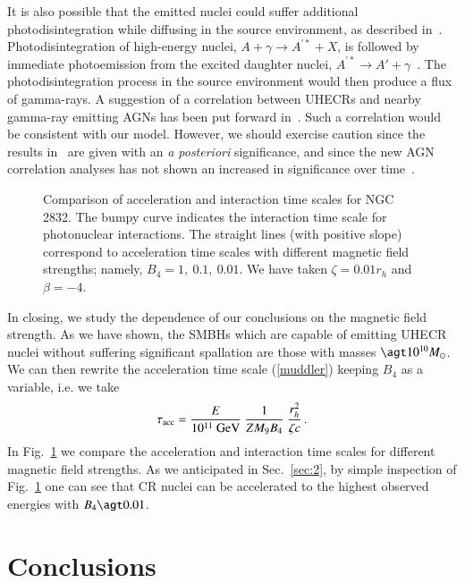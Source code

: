 \documentclass[aps,prd,twocolumn,superscriptaddress,tightenlines,nofootinbib]{revtex4-1}
\newcommand{\postscript}[2]{\setlength{\epsfxsize}{#2\hsize}
   \centerline{\epsfbox{#1}}}
\begin{document}
It is also possible that the emitted nuclei could suffer additional
photodisintegration while diffusing in the source environment, as
described in~\cite{Unger:2015laa}.  Photodisintegration
  of high-energy nuclei, $A + \gamma \to A^{\prime *} +X$, is followed
  by immediate photoemission from the excited daughter nuclei,
  \mbox{$A^{\prime *} \to A' + \gamma$~\cite{Anchordoqui:2006pd}.} The
  photodisintegration process in the source environment would then
  produce a flux of gamma-rays. A suggestion of a correlation between
  UHECRs and nearby gamma-ray emitting AGNs has been put forward
  in~\cite{Nemmen:2010bp}. Such a correlation would be consistent with
  our model. However, we should exercise caution since the results
  in~\cite{Nemmen:2010bp} are given with an {\it a posteriori}
  significance, and since the new AGN correlation analyses has not
  shown an increased in significance over
  time~\cite{PierreAuger:2014yba}.


\begin{figure}
\postscript{NGC_2832_varyB}{0.99}
\caption{Comparison of acceleration and interaction time scales for
  NGC 2832. The
  bumpy curve indicates the interaction time scale for photonuclear
  interactions. The straight lines (with
  positive slope) correspond to acceleration time scales with different
magnetic field strengths; namely, $B_4 = 1,\ 0.1,\ 0.01$. We have taken $\zeta =
0.01 r_h$ and  $\beta = -4$.}
\label{fig:varyB}
\end{figure}

In closing, we study the dependence of our conclusions on the magnetic
field strength. As we have shown, the SMBHs which are capable of emitting
UHECR nuclei without suffering significant spallation are those with masses
$\agt 10^{10} M_\odot$. We can then rewrite the acceleration time
scale (\ref{muddler}) keeping $B_4$ as a variable, i.e. we take 
\begin{equation}
\tau_{\rm acc} = \frac{E}{10^{11}~{\rm GeV}}  \  \frac{1}{Z M_9 B_4}
\ \frac{r_h^2}{ \zeta c} \, .
\end{equation}
 In Fig.~\ref{fig:varyB} we
compare the acceleration and interaction time scales for different
magnetic field strengths. As we anticipated in Sec.~\ref{sec:2}, by simple inspection
of Fig.~\ref{fig:varyB} one can see that CR nuclei can be
accelerated to the highest observed energies with $B_4 \agt 0.01$.


\section{Conclusions}
\end{document}
